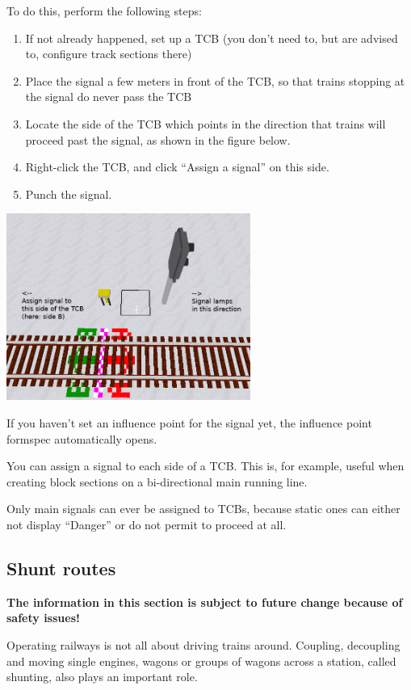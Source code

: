 \documentclass[english]{paper}
\begin{document}
To do this, perform the following steps:
\begin{enumerate}
\item If not already happened, set up a TCB (you don't need to, but are
advised to, configure track sections there)
\item Place the signal a few meters in front of the TCB, so that trains
stopping at the signal do never pass the TCB
\item Locate the side of the TCB which points in the direction that trains
will proceed past the signal, as shown in the figure below.
\item Right-click the TCB, and click ``Assign a signal'' on this side.
\item Punch the signal.
\end{enumerate}
\includegraphics[width=8cm]{8_home_moritz_Home_Projekte_Minetest_minetest_mods_advtrains_assets_lyx_img_assign_signal.png}

If you haven't set an influence point for the signal yet, the influence
point formspec automatically opens.

You can assign a signal to each side of a TCB. This is, for example,
useful when creating block sections on a bi-directional main running
line.

Only main signals can ever be assigned to TCBs, because static ones
can either not display ``Danger'' or do not permit to proceed at
all.

\subsection{Shunt routes}

\textbf{The information in this section is subject to future change
because of safety issues!}

Operating railways is not all about driving trains around. Coupling,
decoupling and moving single engines, wagons or groups of wagons across
a station, called shunting, also plays an important role.
\end{document}
